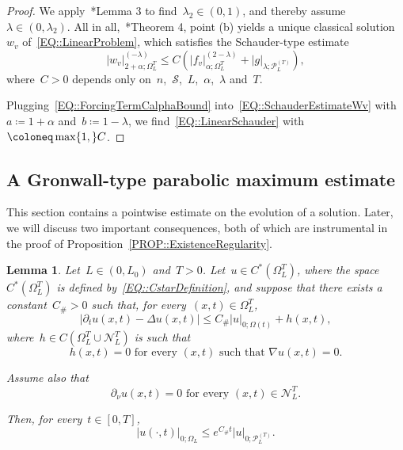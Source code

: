 \documentclass[12pt,a4paper]{amsart}
\makeatletter
\numberwithin{equation}{section}
\newtheorem{lemma}[theorem]{Lemma}
\theoremstyle{definition}
\theoremstyle{remark}
\newcommand{\abs}[1]{\left\lvert#1\right\rvert}
\renewcommand{\leq}{\leqslant}
\newcommand{\const}[1]{%
  \csname const@#1\endcsname%
}
\makeatother
\begin{document}
\begin{proof}
    We apply~\cite{MR826642}*{Lemma 3} to find~$\lambda_2 \in (0,1)$, and thereby assume~$\lambda \in (0,\lambda_2)$. All in all,~\cite{MR826642}*{Theorem 4, point (b)} yields a unique classical solution~$w_v$ of~\eqref{EQ::LinearProblem}, which satisfies the Schauder-type estimate
    \begin{equation}\label{EQ::SchauderEstimateWv}
        \abs{w_v}_{2+\alpha;\Omega_L^T}^{(-\lambda)} \leq C \left( \abs{f_v}_{\alpha; \Omega_L^T}^{(2-\lambda)} + \abs{g}_{\lambda; \mathcal{P}_L^{(T)}} \right),
    \end{equation}
    where~$C > 0$ depends only on~$n$,~$\mathcal{S}$,~$L$,~$\alpha$,~$\lambda$ and~$T$.

    Plugging~\eqref{EQ::ForcingTermCalphaBound} into~\eqref{EQ::SchauderEstimateWv} with~$a \coloneq 1+\alpha$ and~$b \coloneq 1-\lambda$, we find~\eqref{EQ::LinearSchauder} with~$\const{CONST::LinearSchauder} \coloneq \max\{1,\const{CONST::ForcingTermCalphaBound}\}C$.
\end{proof}

\subsection{A Gronwall-type parabolic maximum estimate}
This section contains a pointwise estimate on the evolution of a solution. Later, we will discuss two important consequences, both of which are instrumental in the proof of Proposition~\ref{PROP::ExistenceRegularity}.

\begin{lemma}\label{LEM::ParabolicGronwall}
    Let~$L \in (0,L_0)$ and~$T > 0$. Let~$u \in C^\ast(\Omega_L^T)$, where the space~$C^\ast(\Omega_L^T)$ is defined by~\eqref{EQ::CstarDefinition}, and suppose that there exists a constant~$C_\# > 0$ such that, for every~$(x,t) \in \Omega_L^T$,
    \begin{equation}\label{EQ::ParabolicGronwallAssumption}
        \abs{\partial_t u(x,t) - \Delta u(x,t)} \leq C_\# \abs{u}_{0; \Omega(t)} + h(x,t),
    \end{equation}
    where~$h \in C\left(\Omega_L^T \cup \mathcal{N}_L^T\right)$ is such that
    \begin{equation}\label{EQ::ParabolicGronwallH}
        h(x,t) = 0\text{ for every }(x,t)\text{ such that }\nabla u(x,t) = 0.
    \end{equation}

    Assume also that
    \begin{equation}\label{EQ::ParabolicGronwallNeumann}
        \partial_\nu u(x,t)= 0\text{ for every }(x,t)\in\mathcal{N}_L^T.
    \end{equation}

    Then, for every~$t \in [0,T]$, %
    \begin{equation}\label{EQ::ParabolicGronwallThesis}
        \abs{u(\cdot, t)}_{0; \Omega_L} \leq e^{C_\# t} \abs{u}_{0; \mathcal{P}_L^{(T)}}.
    \end{equation}
\end{lemma}
\end{document}
